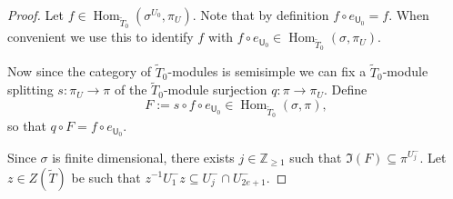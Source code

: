 \documentclass[10pt,a4paper]{amsart}
\newcommand{\Hom}{\operatorname{Hom}}
\newcommand{\Tt}{\widetilde{T}}
\newcommand{\Uf}{\mathsf{U}}
\begin{document}
\begin{proof}
	Let $f\in \Hom_{\Tt_{0}}(\sigma^{U_{0}},\pi_{U})$. Note that by definition $f\circ e_{{\Uf}_{0}}=f$. When convenient we use this to identify $f$ with $f\circ e_{{\Uf}_{0}}\in \Hom_{\Tt_{0}}(\sigma,\pi_{U})$.
	
	Now since the category of $\Tt_{0}$-modules is semisimple we can fix a $\Tt_{0}$-module splitting $s:\pi_{U}\rightarrow \pi$ of the $\Tt_{0}$-module surjection $q:\pi\rightarrow \pi_{U}$. Define 
    \[
    F:=s\circ f\circ e_{{\Uf}_{0}}\in \Hom_{\Tt_{0}}(\sigma,\pi),
    \]
    so that $q\circ F=f\circ e_{{\Uf}_{0}}$.
	
	Since $\sigma$ is finite dimensional, there exists $j\in \mathbb{Z}_{\geq 1}$ such that $\Im(F)\subseteq \pi^{U^{-}_{j}}$. Let $z\in Z(\Tt)$ be such that $z^{-1}U^{-}_{1}z\subseteq U^{-}_{j}\cap U^{-}_{2e+1}$.


\end{proof}
\end{document}

